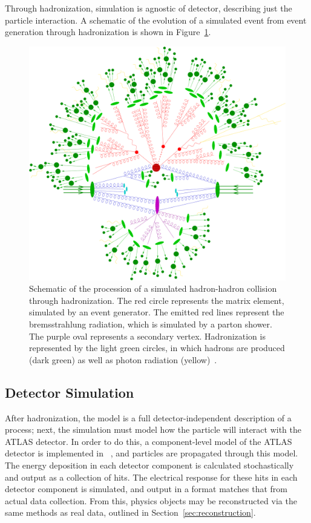 Through hadronization, simulation is agnostic of detector, describing just the particle interaction. A schematic of the evolution of a simulated event from event generation through hadronization is shown in Figure~\ref{fig:parton-shower-sketch}.

\begin{figure}[!thp]
    \centering
    \includegraphics[width=1\textwidth]{chapters/chapter3_eventreco/images/parton-shower.png}

    \caption[Schematic of the procession of a simulated hadron-hadron collision.]{Schematic of the procession of a simulated hadron-hadron collision through hadronization. The red circle represents the matrix element, simulated by an event generator. The emitted red lines represent the bremsstrahlung radiation, which is simulated by a parton shower. The purple oval represents a secondary vertex. Hadronization is represented by the light green circles, in which hadrons are produced (dark green) as well as photon radiation (yellow)~\cite{parton-shower-sketch}.}
    \label{fig:parton-shower-sketch}
\end{figure}


\subsection{Detector Simulation}  \label{ssec:simulation} 
After hadronization, the model is a full detector-independent description of a process; next, the simulation must model how the particle will interact with the ATLAS detector. In order to do this, a component-level model of the ATLAS detector is implemented in \GEANTFOUR~\cite{geant4}, and particles are propagated through this model. The energy deposition in each detector component is calculated stochastically and output as a collection of hits. The electrical response for these hits in each detector component is simulated, and output in a format matches that from actual data collection. From this, physics objects may be reconstructed via the same methods as real data, outlined in Section~\ref{sec:reconstruction}.

